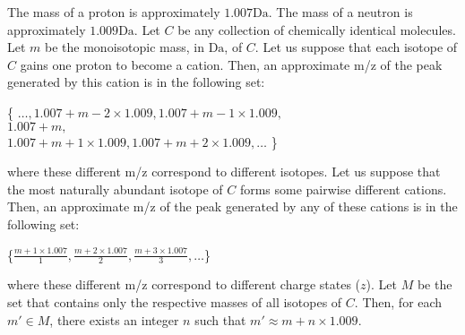 {
\def \m {c}
\def \M {C}
\def \mMass {m} 
\def \setofMass {M}

The mass of a proton  is approximately \(1.007\si{\dalton}\).
The mass of a neutron is approximately \(1.009\si{\dalton}\).
Let \(\M\) be any collection of chemically identical molecules. 
Let \(\mMass\) be the monoisotopic mass, in \(\si{\dalton}\), of \(\M\).
Let us suppose that each isotope of \(\M\) gains one proton to become a cation.
Then, an approximate \gls{m/z} of the peak generated by this cation is in the following set:
		\begin{tightcenter}
		\{
		\(\dots, 1.007+\mMass-2{\times}1.009,1.007+\mMass-1{\times}1.009,\) \\
		\(1.007+\mMass,\) \\
		\(1.007+\mMass+1{\times}1.009,1.007+\mMass+2{\times}1.009, \dots\) 
		\}
	\end{tightcenter}
where these different \gls{m/z} correspond to different isotopes.
Let us suppose that the most naturally abundant isotope of \(\M\) forms some pairwise different cations.
Then, an approximate \gls{m/z} of the peak generated by any of these cations is in the following set:
		\begin{tightcenter}
		\{\(\displaystyle
		\frac{\mMass+1{\times}1.007}{1},
		\frac{\mMass+2{\times}1.007}{2},
		\frac{\mMass+3{\times}1.007}{3},\dots
		\)\}
		\end{tightcenter}	
where these different \gls{m/z} correspond to different charge states (\(z\)).
Let \(\setofMass\) be the set that contains only the respective masses of all isotopes of \(\M\).
Then, for each \(m'\in\setofMass\), there exists an integer \(n\) such that \(m'\approx\mMass + n{\times}1.009\).
}

